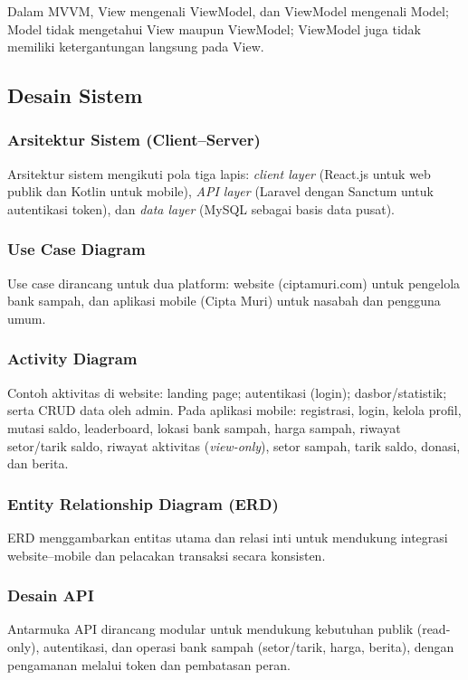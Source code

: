 \documentclass[conference, compsoc, twoside]{IEEEtran}
\begin{document}
Dalam MVVM, View mengenali ViewModel, dan ViewModel mengenali Model; Model tidak mengetahui View maupun ViewModel; ViewModel juga tidak memiliki ketergantungan langsung pada View.

\subsection{Desain Sistem}
\subsubsection{Arsitektur Sistem (Client–Server)}
Arsitektur sistem mengikuti pola tiga lapis: \emph{client layer} (React.js untuk web publik dan Kotlin untuk mobile), \emph{API layer} (Laravel dengan Sanctum untuk autentikasi token), dan \emph{data layer} (MySQL sebagai basis data pusat).

\subsubsection{Use Case Diagram}
Use case dirancang untuk dua platform: website (ciptamuri.com) untuk pengelola bank sampah, dan aplikasi mobile (Cipta Muri) untuk nasabah dan pengguna umum.

\subsubsection{Activity Diagram}
Contoh aktivitas di website: landing page; autentikasi (login); dasbor/statistik; serta CRUD data oleh admin. Pada aplikasi mobile: registrasi, login, kelola profil, mutasi saldo, leaderboard, lokasi bank sampah, harga sampah, riwayat setor/tarik saldo, riwayat aktivitas (\emph{view-only}), setor sampah, tarik saldo, donasi, dan berita.

\subsubsection{Entity Relationship Diagram (ERD)}
ERD menggambarkan entitas utama dan relasi inti untuk mendukung integrasi website–mobile dan pelacakan transaksi secara konsisten.

\subsubsection{Desain API}
Antarmuka API dirancang modular untuk mendukung kebutuhan publik (read-only), autentikasi, dan operasi bank sampah (setor/tarik, harga, berita), dengan pengamanan melalui token dan pembatasan peran.
\end{document}
